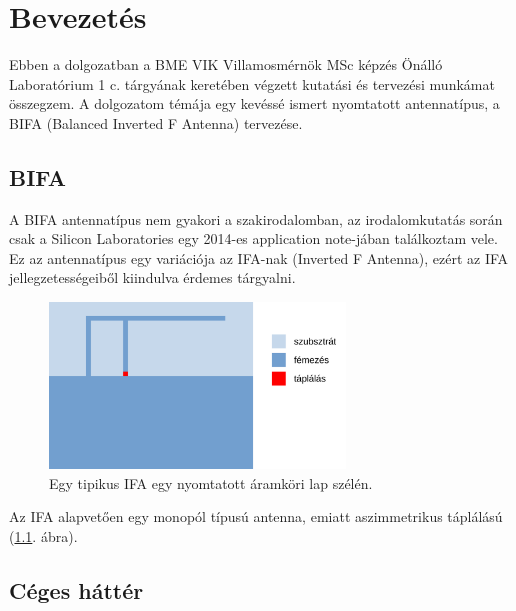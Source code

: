 \chapter{Bevezetés}
Ebben a dolgozatban a BME VIK Villamosmérnök MSc képzés Önálló Laboratórium 1 c. tárgyának keretében végzett kutatási és tervezési munkámat összegzem. A dolgozatom témája egy kevéssé ismert nyomtatott antennatípus, a BIFA (Balanced Inverted F Antenna) tervezése.
\section{BIFA}
\par A BIFA antennatípus nem gyakori a szakirodalomban, az irodalomkutatás során csak a Silicon Laboratories egy 2014-es application note-jában \cite{an847} találkoztam vele. Ez az antennatípus egy variációja az IFA-nak (Inverted F Antenna), ezért az IFA jellegzetességeiből kiindulva érdemes tárgyalni.
\begin{figure}[h]
	\centering
	\includegraphics[width=0.7\textwidth]{kep/tipikus_ifa.pdf}
	\caption{Egy tipikus IFA egy nyomtatott áramköri lap szélén.}
	\label{fig:tipikus_ifa}
\end{figure}
\par Az IFA alapvetően egy monopól típusú antenna, emiatt aszimmetrikus táplálású (\ref{fig:tipikus_ifa}. ábra). 
\section{Céges háttér}

